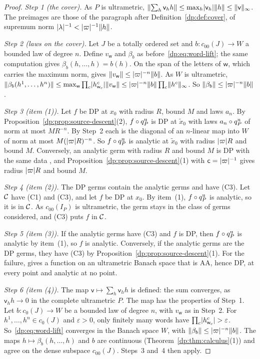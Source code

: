 \begin{proof}
\emph{Step 1 (the cover).} As $P$ is ultrametric, $\lVert \sum_h\mathsf v_hh\rVert\le\max_h\lvert \mathsf v_h\rvert\lVert h\rVert\le\lVert \mathsf v\rVert_\infty$. The preimages are those of the paragraph after Definition~\ref{dp:def:cover}, of supremum norm $\lvert \lambda\rvert^{-1}<\lvert \varpi\rvert^{-1}\lVert h\rVert$.

\emph{Step 2 (laws on the cover).} Let $J$ be a totally ordered set and $b\colon c_{00}(J)\to W$ a bounded law of degree $n$. Define $v_{\mathsf w}$ and $\beta_b$ as before~\eqref{dp:eq:word-lift}; the same computation gives $\beta_b(h,\dots,h)=b(h)$. On the span of the letters of $\mathsf w$, which carries the maximum norm, \cite[Lemma~Q.2(4)]{I} gives $\lVert v_{\mathsf w}\rVert\le\lvert \varpi\rvert^{-n}\lVert b\rVert$. As $W$ is ultrametric, $\lVert \beta_b(h^1,\dots,h^n)\rVert\le\max_{\mathsf w}\prod_c\lvert h^c_{\mathsf w_c}\rvert\lVert v_{\mathsf w}\rVert\le\lvert \varpi\rvert^{-n}\lVert b\rVert\prod_c\lVert h^c\rVert_\infty$. So $\lVert \beta_b\rVert\le\lvert \varpi\rvert^{-n}\lVert b\rVert$.

\emph{Step 3 (item (1)).} Let $f$ be DP at $x_0$ with radius $R$, bound $M$ and laws $a_n$. By Proposition~\ref{dp:prop:source-descent}(2), $f\circ q^{\rm u}_P$ is DP at $\tilde x_0$ with laws $a_n\circ q^{\rm u}_P$ of norm at most $MR^{-n}$. By Step~2 each is the diagonal of an $n$-linear map into $W$ of norm at most $M(\lvert \varpi\rvert R)^{-n}$. So $f\circ q^{\rm u}_P$ is analytic at $\tilde x_0$ with radius $\lvert \varpi\rvert R$ and bound $M$. Conversely, an analytic germ with radius $R$ and bound $M$ is DP with the same data \cite[Proposition~14.9(1)]{I}, and Proposition~\ref{dp:prop:source-descent}(1) with $\mathsf c=\lvert \varpi\rvert^{-1}$ gives radius $\lvert \varpi\rvert R$ and bound $M$.

\emph{Step 4 (item (2)).} The DP germs contain the analytic germs and have (C3). Let $\mathcal{C}$ have (C1) and (C3), and let $f$ be DP at $x_0$. By item~(1), $f\circ q^{\rm u}_P$ is analytic, so it is in $\mathcal{C}$. As $c_{00}(I_P)$ is ultrametric, the germ stays in the class of germs considered, and (C3) puts $f$ in $\mathcal{C}$.

\emph{Step 5 (item (3)).} If the analytic germs have (C3) and $f$ is DP, then $f\circ q^{\rm u}_P$ is analytic by item~(1), so $f$ is analytic. Conversely, if the analytic germs are the DP germs, they have (C3) by Proposition~\ref{dp:prop:source-descent}(1). For the failure, \cite[Proposition~14.40(3)]{I} gives a function on an ultrametric Banach space that is AA, hence DP, at every point and analytic at no point.

\emph{Step 6 (item (4)).} The map $\mathsf v\mapsto\sum_h\mathsf v_hh$ is defined: the sum converges, as $\mathsf v_hh\to0$ in the complete ultrametric $P$. The map has the properties of Step~1. Let $b\colon c_0(J)\to W$ be a bounded law of degree $n$, with $v_{\mathsf w}$ as in Step~2. For $h^1,\dots,h^n\in c_0(J)$ and $\varepsilon>0$, only finitely many words have $\prod_c\lvert h^c_{\mathsf w_c}\rvert>\varepsilon$. So~\eqref{dp:eq:word-lift} converges in the Banach space $W$, with $\lVert \beta_b\rVert\le\lvert \varpi\rvert^{-n}\lVert b\rVert$. The maps $h\mapsto\beta_b(h,\dots,h)$ and $b$ are continuous (Theorem~\ref{dp:thm:calculus}(1)) and agree on the dense subspace $c_{00}(J)$. Steps~3 and~4 then apply.
\end{proof}

